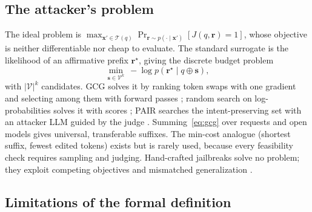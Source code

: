 \documentclass[10pt,a4paper]{extarticle}
\theoremstyle{definition}
\newcommand{\xadv}{\mathbf{x}'}
\newcommand{\T}{\mathcal{T}}
\begin{document}
\subsection{The attacker's problem}

The ideal problem is $\max_{\xadv\in\T(q)}\Pr_{\mathbf{r}\sim p(\cdot\mid\xadv)}[J(q,\mathbf{r})=1]$, whose objective is neither differentiable nor cheap to evaluate. The standard surrogate is the likelihood of an affirmative prefix $\mathbf{r}^\star$, giving the discrete budget problem
\begin{equation}\label{eq:gcg}
\min_{\mathbf{s}\in\mathcal{V}^k}\ -\log p(\mathbf{r}^\star\mid q\oplus\mathbf{s}),
\end{equation}
with $|\mathcal{V}|^k$ candidates. GCG solves it by ranking token swaps with one gradient and selecting among them with forward passes \citep{zou2023universal}; random search on log-probabilities solves it with scores \citep{andriushchenko2024simple}; PAIR searches the intent-preserving set with an attacker LLM guided by the judge \citep{chao2023jailbreaking}. Summing~\eqref{eq:gcg} over requests and open models gives universal, transferable suffixes. The min-cost analogue (shortest suffix, fewest edited tokens) exists but is rarely used, because every feasibility check requires sampling and judging. Hand-crafted jailbreaks solve no problem; they exploit competing objectives and mismatched generalization \citep{wei2023jailbroken}.

\subsection{Limitations of the formal definition}
\end{document}
